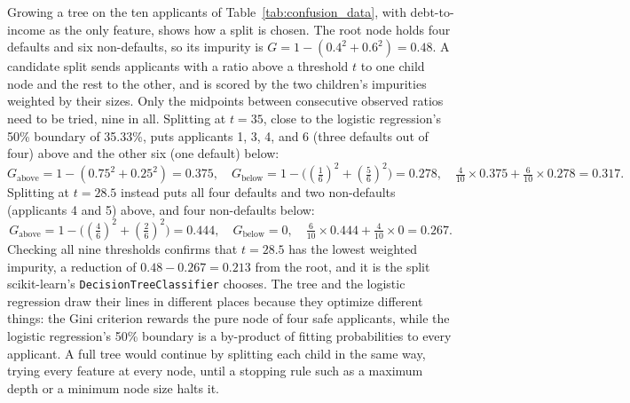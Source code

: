 \documentclass[../ai_in_finance]{subfiles}
\begin{document}
Growing a tree on the ten applicants of Table~\ref{tab:confusion_data}, with debt-to-income as the only feature, shows how a split is chosen. The root node holds four defaults and six non-defaults, so its impurity is $G = 1 - (0.4^2 + 0.6^2) = 0.48$. A candidate split sends applicants with a ratio above a threshold $t$ to one child node and the rest to the other, and is scored by the two children's impurities weighted by their sizes. Only the midpoints between consecutive observed ratios need to be tried, nine in all. Splitting at $t = 35$, close to the logistic regression's 50\% boundary of 35.33\%, puts applicants 1, 3, 4, and 6 (three defaults out of four) above and the other six (one default) below:
\begin{equation*}
G_{\text{above}} = 1 - (0.75^2 + 0.25^2) = 0.375, \quad G_{\text{below}} = 1 - \big((\tfrac16)^2 + (\tfrac56)^2\big) = 0.278, \quad \tfrac{4}{10} \times 0.375 + \tfrac{6}{10} \times 0.278 = 0.317.
\end{equation*}
Splitting at $t = 28.5$ instead puts all four defaults and two non-defaults (applicants 4 and 5) above, and four non-defaults below:
\begin{equation*}
G_{\text{above}} = 1 - \big((\tfrac46)^2 + (\tfrac26)^2\big) = 0.444, \quad G_{\text{below}} = 0, \quad \tfrac{6}{10} \times 0.444 + \tfrac{4}{10} \times 0 = 0.267.
\end{equation*}
Checking all nine thresholds confirms that $t = 28.5$ has the lowest weighted impurity, a reduction of $0.48 - 0.267 = 0.213$ from the root, and it is the split scikit-learn's \texttt{DecisionTreeClassifier} chooses. The tree and the logistic regression draw their lines in different places because they optimize different things: the Gini criterion rewards the pure node of four safe applicants, while the logistic regression's 50\% boundary is a by-product of fitting probabilities to every applicant. A full tree would continue by splitting each child in the same way, trying every feature at every node, until a stopping rule such as a maximum depth or a minimum node size halts it.
\end{document}
